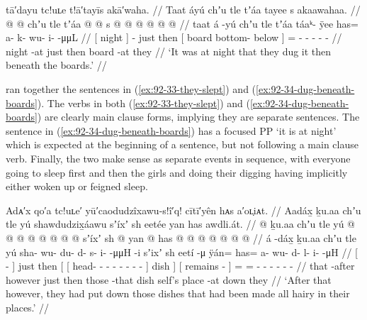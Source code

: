\ex\label{ex:92-34-dug-beneath-boards}%
%
\begingl
	\glpreamble	tā′dayu tc!uʟe t!ā′tayīs akā′waha. //
	\glpreamble	Taat áyú chʼu tle tʼáa tayee s akaawahaa. //
	\gla	{}  @ {} {}  @ {}
		chʼu tle {} tʼáa  @ {} @ {} {}
		s @  @ {} @ {} @ {} @ {} @ {} //
	\glb	{} taat {} {} á -yú
		chʼu tle {} tʼáa táaᵏ- ÿee {} {}
		has= a- k- wu- i-  -μμL //
	\glc	{}[ night \· {}]  -
		just then {}[ board bottom- below \· {}]
		= - - - -  - //
	\gld	{} night -at {}  {}
		just then {} board  {} -at {}
		they  {} {} {} {} {} //
	\glft	‘It was at night that they dug it then beneath the boards.’
		//
\endgl
\xe

\citeauthor{swanton:1909} ran together the sentences in (\ref{ex:92-33-they-slept}) and (\ref{ex:92-34-dug-beneath-boards}).
The verbs in both (\ref{ex:92-33-they-slept}) and (\ref{ex:92-34-dug-beneath-boards}) are clearly main clause forms, implying they are separate sentences.
The sentence in (\ref{ex:92-34-dug-beneath-boards}) has a focused PP  ‘it is at night’ which is expected at the beginning of a sentence, but not following a main clause verb.
Finally, the two make sense as separate events in sequence, with everyone going to sleep first and then the girls and doing their digging having implicitly either woken up or feigned sleep.

\ex\label{ex:92-35-put-down-hairy-dishes-in-their-places}%
%
\begingl
	\glpreamble	Adᴀ′x qo′a tc!uʟe′ yū′caodudzîxawu-s!î′q! cītī′yên hᴀs a′oʟ̣iᴀt. //
	\glpreamble	Aadáx̱ ḵu.aa chʼu tle yú shawdudzix̱áawu sʼíxʼ sh eetée yan has awdli.át.  //
	\gla	{}  @ {} {} ḵu.aa
		chʼu tle {} yú
			{}  @ {} @ {} @ {} @ {} @ {} @ {} @ {} @ {} {}
			sʼíxʼ {}
		{} sh  @ {} {}
		yan @ has @  @ {} @ {} @ {} @ {} @ {} @ {} //
	\glb	{} á -dáx̱ {} ḵu.aa
		chʼu tle {} yú
			{} sha- wu- du- d- s- i-  -μμH -i {}
			sʼixʼ {}
		{} sh eetí -μ {}
		ÿán= has= a- wu- d- l- i-  -μH //
	\glc	{}[  - {}] 
		just then {}[ 
			{}[ head- - - - - -
				 - - {}]
			dish {}]
		{}[  remains - {}]
		= = - - - - -
			 - //
	\gld	{} that -after {} however
		just then {} those
			{}  {} {} {} {} {} {} {} -that {}
			dish {}
		{} self’s place -at {}
		down they  {} {} {} {} {} {} //
	\glft	‘After that however, they had put down those dishes that had been made all hairy in their places.’
		//
\endgl
\xe

